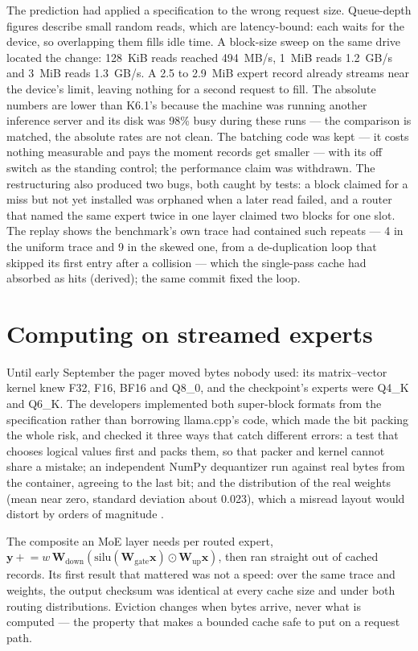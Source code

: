 The prediction had applied a specification to the wrong request size.
Queue-depth figures describe small random reads, which are latency-bound: each
waits for the device, so overlapping them fills idle time. A block-size sweep
on the same drive located the change: 128~KiB reads reached 494~MB/s, 1~MiB
reads 1.2~GB/s and 3~MiB reads 1.3~GB/s. A 2.5 to 2.9~MiB expert record already
streams near the device's limit, leaving nothing for a second request to fill.
The absolute numbers are lower than K6.1's because the machine was running
another inference server and its disk was 98\% busy during these runs --- the
comparison is matched, the absolute rates are not clean. The batching code was
kept --- it costs nothing measurable and pays the moment records get smaller ---
with its off switch as the standing control; the performance claim was
withdrawn. The restructuring also produced two bugs, both caught
by tests: a block claimed for a miss but not yet installed was orphaned when a
later read failed, and a router that named the same expert twice in one layer
claimed two blocks for one slot. The replay shows the benchmark's own trace had
contained such repeats --- 4 in the uniform trace and 9 in the skewed one, from
a de-duplication loop that skipped its first entry after a collision --- which
the single-pass cache had absorbed as hits (derived); the same commit fixed the
loop.

\section{Computing on streamed experts}

Until early September the pager moved bytes nobody used: its matrix--vector
kernel knew F32, F16, BF16 and Q8\_0, and the checkpoint's experts were Q4\_K and
Q6\_K. The developers implemented both super-block formats from the
specification rather than borrowing llama.cpp's code, which made the bit
packing the whole risk, and checked it three ways that catch different errors:
a test that chooses logical values first and packs them, so that packer and
kernel cannot share a mistake; an independent NumPy dequantizer run against
real bytes from the container, agreeing to the last bit; and the distribution
of the real weights (mean near zero, standard deviation about 0.023), which a
misread layout would distort by orders of magnitude \cite{hermon2026kquant}.

The composite an MoE layer needs per routed expert,
$\mathbf{y} \mathrel{+}= w\,\mathbf{W}_{\mathrm{down}}(\mathrm{silu}(\mathbf{W}_{\mathrm{gate}}\mathbf{x}) \odot \mathbf{W}_{\mathrm{up}}\mathbf{x})$,
then ran straight out of cached records. Its first result that mattered was
not a speed: over the same trace and weights, the output checksum was
identical at every cache size and under both routing distributions. Eviction
changes when bytes arrive, never what is computed --- the property that makes a
bounded cache safe to put on a request path.

